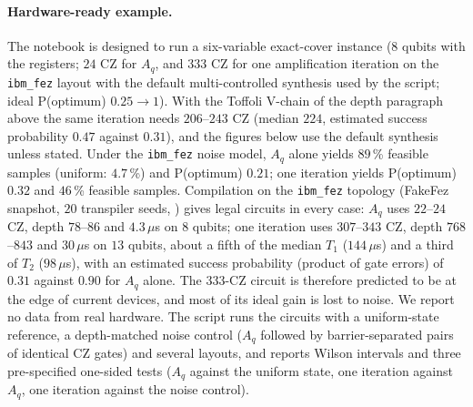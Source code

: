 \paragraph{Hardware-ready example.} The notebook  is designed to run a six-variable exact-cover instance ($8$ qubits with the registers; $24$ CZ for $A_q$, and $333$ CZ for one amplification iteration on the \texttt{ibm\_fez} layout with the default multi-controlled synthesis used by the script; ideal P(optimum) $0.25\to1$). With the Toffoli V-chain of the depth paragraph above the same iteration needs $206$--$243$ CZ (median $224$, estimated success probability $0.47$ against $0.31$), and the figures below use the default synthesis unless stated. Under the \texttt{ibm\_fez} noise model, $A_q$ alone yields $89$\,\% feasible samples (uniform: $4.7$\,\%) and P(optimum) $0.21$; one iteration yields P(optimum) $0.32$ and $46$\,\% feasible samples. Compilation on the \texttt{ibm\_fez} topology (FakeFez snapshot, $20$ transpiler seeds, ) gives legal circuits in every case: $A_q$ uses $22$--$24$ CZ, depth $78$--$86$ and $4.3\,\mu$s on $8$ qubits; one iteration uses $307$--$343$ CZ, depth $768$--$843$ and $30\,\mu$s on $13$ qubits, about a fifth of the median $T_1$ ($144\,\mu$s) and a third of $T_2$ ($98\,\mu$s), with an estimated success probability (product of gate errors) of $0.31$ against $0.90$ for $A_q$ alone. The 333-CZ circuit is therefore predicted to be at the edge of current devices, and most of its ideal gain is lost to noise. We report no data from real hardware. The script  runs the circuits with a uniform-state reference, a depth-matched noise control ($A_q$ followed by barrier-separated pairs of identical CZ gates) and several layouts, and  reports Wilson intervals and three pre-specified one-sided tests ($A_q$ against the uniform state, one iteration against $A_q$, one iteration against the noise control).
